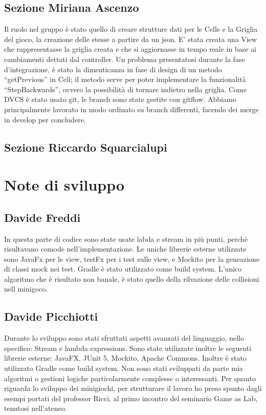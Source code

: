\documentclass[a4paper,12pt]{report}
\begin{document}
	\subsection{Sezione Miriana Ascenzo}

	Il ruolo nel gruppo è stato quello di creare strutture dati per le Celle e la Griglia del gioco, la creazione delle stesse a partire da un json.
    E' stata creata una View che rappresentasse la griglia creata e che si aggiornasse in tempo reale in base ai cambiamenti dettati dal controller.
	Un problema presentatosi durante la fase d’integrazione, è stato la dimenticanza in fase di design di un metodo “getPrevious” in Cell;
    il metodo serve per poter implementare la funzionalità “StepBackwards”, ovvero la possibilità di tornare indietro nella griglia.
    Come DVCS è stato usato git, le branch sono state gestite con gitflow.
    Abbiamo principalmente lavorato in modo ordinato su branch differenti, facendo dei merge in develop per concludere.

	\subsection{Sezione Riccardo Squarcialupi}


	\section{Note di sviluppo}

	\subsection{Davide Freddi}

	In questa parte di codice sono state usate labda e stream in più punti, perchè risultavano comode nell'implementazione.
    Le uniche librerie esterne utilizzate sono JavaFx per le view, testFx per i test sulle view, e Mockito per la geneazione di classi mock nei test.
    Gradle è stato utilizzato come build system.
    L'unico algoritmo che è risultato non banale, è stato quello della rilvazione delle collisioni nell minigoco.

	\subsection{Davide Picchiotti}

    Durante lo sviluppo sono stati sfruttati aspetti avanzati del linguaggio, nello specifico: Stream e lambda expressions.\newline
    Sono state utilizzate inoltre le seguenti librerie esterne: JavaFX, JUnit 5, Mockito, Apache Commons.\newline
    Inoltre è stato utilizzato Gradle come build system.\newline
    Non sono stati sviluppati da parte mia algoritmi o gestioni logiche particolarmente complesse o interessanti.\newline
    Per quanto riguarda lo sviluppo dei minigiochi, per strutturare il lavoro ho preso spunto dagli esempi portati del professor Ricci,
    al primo incontro del seminario Game as Lab, tenutosi nell'ateneo.\newline
\end{document}

